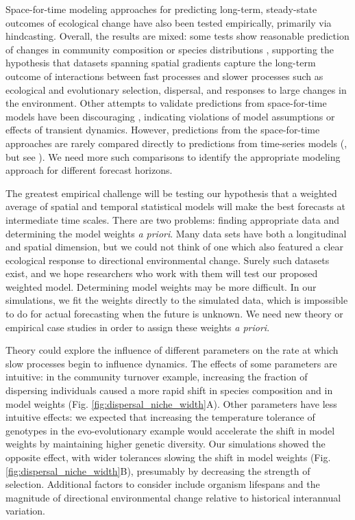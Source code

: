 \documentclass[11pt]{article}
\begin{document}
Space-for-time modeling approaches for predicting long-term, steady-state outcomes of ecological change have also been tested empirically, primarily via hindcasting. Overall, the results are mixed: some tests show reasonable prediction of changes in community composition \citep{Blois2013,Illan2014} or species distributions \citep{Norberg2019}, supporting the hypothesis that datasets spanning spatial gradients capture the long-term outcome of interactions between fast processes and slower processes such as ecological and evolutionary selection, dispersal, and responses to large changes in the environment. Other attempts to validate predictions from space-for-time models have been discouraging \citep{Worth2014,Illan2014,Davis2014,Brun2016,Veloz2012}, indicating violations of model assumptions or effects of transient dynamics. However, predictions from the space-for-time approaches are rarely compared directly to predictions from time-series models (\citealt{harris_forecasting_2018}, but see \citealt{Renwick2018}). We need more such comparisons to identify the appropriate modeling approach for different forecast horizons. 

The greatest empirical challenge will be testing our hypothesis that a weighted average of spatial and temporal statistical models will make the best forecasts at intermediate time scales. There are two problems: finding appropriate data and determining the model weights \emph{a priori}. Many data sets have both a longitudinal and spatial dimension, but we could not think of one which also featured a clear ecological response to directional environmental change. Surely such datasets exist, and we hope researchers who work with them will test our proposed weighted model. Determining model weights may be more difficult. In our simulations, we fit the weights directly to the simulated data, which is impossible to do for actual forecasting when the future is unknown. We need new theory or empirical case studies in order to assign these weights \emph{a priori}. 

Theory could explore the influence of different parameters on the rate at which slow processes begin to influence dynamics. The effects of some parameters are intuitive: in the community turnover example, increasing the fraction of dispersing individuals caused a more rapid shift in species composition and in model weights (Fig. \ref{fig:dispersal_niche_width}A). Other parameters have less intuitive effects: we expected that increasing the temperature tolerance of genotypes in the evo-evolutionary example would accelerate the shift in model weights by maintaining higher genetic diversity. Our simulations showed the opposite effect, with wider tolerances slowing the shift in model weights (Fig. \ref{fig:dispersal_niche_width}B), presumably by decreasing the strength of selection. Additional factors to consider include organism lifespans and the magnitude of directional environmental change relative to historical interannual variation. 
\end{document}
